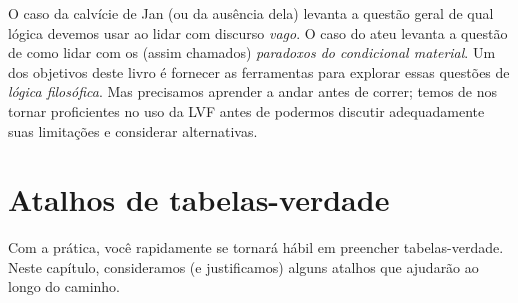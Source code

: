 O caso da calvície de Jan (ou da ausência dela) levanta a questão geral de
qual lógica devemos usar ao lidar com discurso \emph{vago}. O caso do ateu
levanta a questão de como lidar com os (assim chamados) \emph{paradoxos do
condicional material}. Um dos objetivos deste livro é fornecer as
ferramentas para explorar essas questões de \emph{lógica filosófica}. Mas
precisamos aprender a andar antes de correr; temos de nos tornar proficientes
no uso da LVF antes de podermos discutir adequadamente suas limitações e
considerar alternativas.

\chapter{Atalhos de tabelas-verdade}
Com a prática, você rapidamente se tornará hábil em preencher tabelas-verdade. Neste capítulo, consideramos (e justificamos) alguns atalhos que ajudarão ao longo do caminho.

